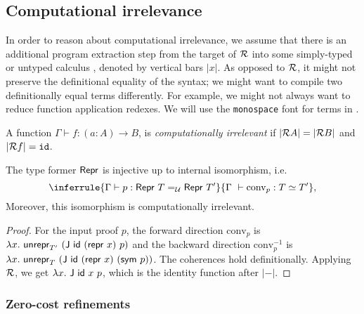 \subsection{Computational irrelevance}\label{sub:irr}

In order to reason about computational irrelevance, we assume that there is an
additional program extraction step from the target of $\mathcal{R}$ into some
simply-typed or untyped calculus \lambdaprog, denoted by vertical bars $|x|$. As
opposed to $\mathcal{R}$, it might not preserve the definitional equality of the syntax;
we might want to compile two definitionally equal terms differently. For
example, we might not always want to reduce function application redexes. We
will use the \texttt{monospace} font for terms in \lambdaprog.

\begin{definition}
    A function $\Gamma \vdash f : (a : A) \to B$, is \emph{computationally irrelevant} if
    $|\mathcal{R} A| = |\mathcal{R} B|$ and $|\mathcal{R} f| = \texttt{id}$.
\end{definition}

\begin{theorem}\label{thm:repr-inj}
	The type former $\textsf{Repr}{}$ is injective up to internal isomorphism, i.e.
	\begin{equation}
	\inferrule{\Gamma \vdash p : \MRepr\ T =_{\univ} \MRepr\ T'}{\Gamma\ \vdash \text{conv}_p : T \simeq T'},
	\end{equation}
	Moreover, this isomorphism is computationally irrelevant.
	\begin{proof}
	For the input proof $p$, the forward direction $\text{conv}_p$ is
	$\lambda x.\ \Munrepr_{T'}\ (\mta{J}\ \mta{id}\ (\Mrepr\ x)\ p)$
	and the backward direction $\text{conv}_p^{-1}$ is
	$\lambda x.\ \Munrepr_{T}\ (\mta{J}\ \mta{id}\ (\Mrepr\ x)\ (\mta{sym}\
	p))$. The coherences hold definitionally. Applying $\mathcal{R}$, we get $\lambda x.\
	\textsf{J}\ \textsf{id}\ x\ p$, which is the identity function after $|-|$.
	\end{proof}
\end{theorem}

\subsubsection{Zero-cost refinements}

